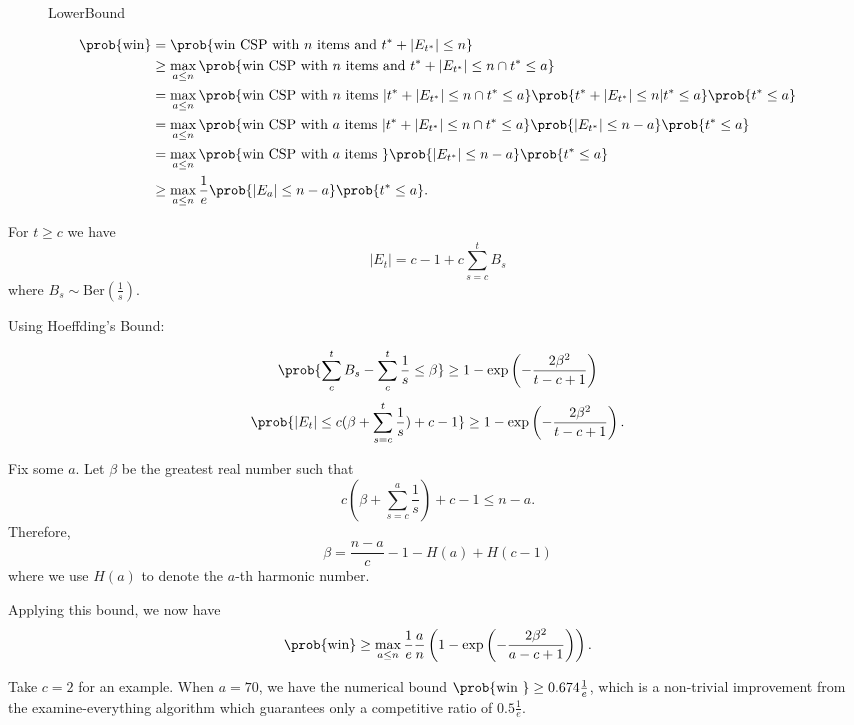 \begin{figure}[ht]
    \centering
    \caption{LowerBound}
    \label{fig:lowerbound}
\end{figure}

\begin{align*}
	 \prob{\text{win}} &= \prob{\text{win CSP with }n \text{ items and } t^* +  |E_{t^*}| \le n}\\
	   &\ge \max_{a \le n} \prob{\text{win CSP with }n \text{ items and } t^* +  |E_{t^*}| \le n \cap t^* \le a}\\
	   &= \max_{a \le n} \prob{\text{win CSP with }n \text{ items } |  t^* +  |E_{t^*}| \le n \cap t^* \le a} \prob{t^* +  |E_{t^*}| \le n | t^* \le a}\prob{t^* \le a}\\
	   &= \max_{a \le n} \prob{\text{win CSP with }a \text{ items } |  t^* +  |E_{t^*}| \le n \cap t^* \le a} \prob{|E_{t^*}|\le n-a} \prob{t^* \le a}\\
	   &= \max_{a \le n} \prob{\text{win CSP with }a \text{ items } } \prob{|E_{t^*}|\le n-a} \prob{t^* \le a}\\
	   &\ge \max_{a \le n} \frac{1}{e } \prob{|E_a|\le n-a} \prob{t^*\le a}
.\end{align*}

For $t\ge c$ we have \[
|E_t| = c-1+c \sum_{s=c}^{t} B_s
\]  where $B_s \sim \text{Ber}(\frac{1}{s })$.

Using Hoeffding's Bound:

\[
\prob{\sum_c^t B_s - \sum_c^t \frac{1}{s } \le \beta} \ge 1-\exp\left( - \frac{2\beta^2}{t-c+1} \right) 
\] 
\[
\prob{|E_t| \le c(\beta+\sum_{s=c }^t \frac{1}{s })+c-1}\ge 1-\exp\left( - \frac{2\beta^2}{t-c+1} \right) 
.\] 

Fix some $a$. Let $\beta$ be the greatest real number such that \[
c(\beta+\sum_{s=c }^a \frac{1}{s })+c-1 \le n-a
.\] 
Therefore,  \[
\beta = \frac{n-a}{c} -1 - H(a)+H(c-1)
\] where we use $H(a)$ to denote the $a $-th harmonic number.

Applying this bound, we now have
\begin{align*}
	\prob{\text{win}} \ge  \max_{a\le n } \frac{1}{e } \frac{a}{n } \left( 1-\exp\left( - \frac{2\beta^2}{a-c+1} \right)  \right) 
.\end{align*}



Take $c=2 $ for an example. When $a = 70$, we have the numerical bound $\prob{\text{win }}\ge 0.674 \frac{1}{e}$, which is a non-trivial improvement from the examine-everything algorithm which guarantees only a competitive ratio of $0.5 \frac{1}{e}$.

